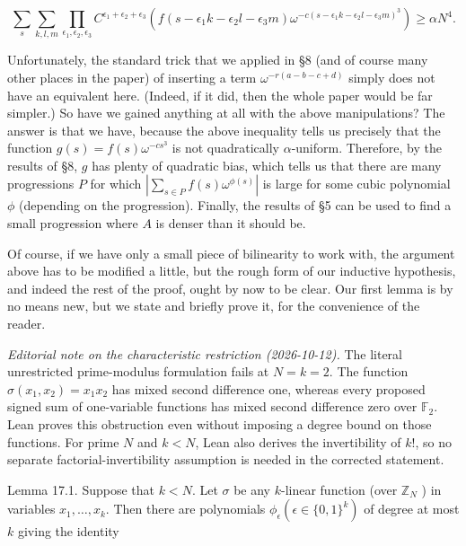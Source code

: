 \documentclass[10pt]{article}
\begin{document}
$$
\sum_{s} \sum_{k, l, m} \prod_{\epsilon_{1}, \epsilon_{2}, \epsilon_{3}} C^{\epsilon_{1}+\epsilon_{2}+\epsilon_{3}}\left(f\left(s-\epsilon_{1} k-\epsilon_{2} l-\epsilon_{3} m\right) \omega^{-c\left(s-\epsilon_{1} k-\epsilon_{2} l-\epsilon_{3} m\right)^{3}}\right) \geqslant \alpha N^{4} .
$$

Unfortunately, the standard trick that we applied in §8 (and of course many other places in the paper) of inserting a term $\omega^{-r(a-b-c+d)}$ simply does not have an equivalent here. (Indeed, if it did, then the whole paper would be far simpler.) So have we gained anything at all with the above manipulations? The answer is that we have, because the above inequality tells us precisely that the function $g(s)=f(s) \omega^{-c s^{3}}$ is not quadratically $\alpha$-uniform. Therefore, by the results of §8, $g$ has plenty of quadratic bias, which tells us that there are many progressions $P$ for which $\left|\sum_{s \in P} f(s) \omega^{\phi(s)}\right|$ is large for some cubic polynomial $\phi$ (depending on the progression). Finally, the results of §5 can be used to find a small progression where $A$ is denser than it should be.

Of course, if we have only a small piece of bilinearity to work with, the argument above has to be modified a little, but the rough form of our inductive hypothesis, and indeed the rest of the proof, ought by now to be clear. Our first lemma is by no means new, but we state and briefly prove it, for the convenience of the reader.

\emph{Editorial note on the characteristic restriction (2026-10-12).}
The literal unrestricted prime-modulus formulation fails at $N=k=2$.
The function $\sigma(x_1,x_2)=x_1x_2$ has mixed second difference one,
whereas every proposed signed sum of one-variable functions has mixed
second difference zero over $\mathbb F_2$. Lean proves this obstruction
even without imposing a degree bound on those functions. For prime $N$
and $k<N$, Lean also derives the invertibility of $k!$, so no separate
factorial-invertibility assumption is needed in the corrected statement.

Lemma 17.1. Suppose that $k<N$. Let $\sigma$ be any $k$-linear function (over $\mathbb{Z}_{N}$ ) in variables $x_{1}, \ldots, x_{k}$. Then there are polynomials $\phi_{\epsilon}\left(\epsilon \in\{0,1\}^{k}\right)$ of degree at most $k$ giving the identity
\end{document}
